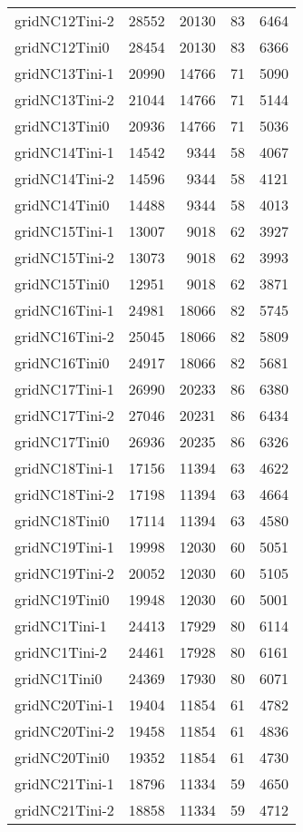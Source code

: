\begin{longtable}{lrrrr}
gridNC12Tini-2 & 28552 & 20130 & 83 & 6464 \\
gridNC12Tini0 & 28454 & 20130 & 83 & 6366 \\
gridNC13Tini-1 & 20990 & 14766 & 71 & 5090 \\
gridNC13Tini-2 & 21044 & 14766 & 71 & 5144 \\
gridNC13Tini0 & 20936 & 14766 & 71 & 5036 \\
gridNC14Tini-1 & 14542 & 9344 & 58 & 4067 \\
gridNC14Tini-2 & 14596 & 9344 & 58 & 4121 \\
gridNC14Tini0 & 14488 & 9344 & 58 & 4013 \\
gridNC15Tini-1 & 13007 & 9018 & 62 & 3927 \\
gridNC15Tini-2 & 13073 & 9018 & 62 & 3993 \\
gridNC15Tini0 & 12951 & 9018 & 62 & 3871 \\
gridNC16Tini-1 & 24981 & 18066 & 82 & 5745 \\
gridNC16Tini-2 & 25045 & 18066 & 82 & 5809 \\
gridNC16Tini0 & 24917 & 18066 & 82 & 5681 \\
gridNC17Tini-1 & 26990 & 20233 & 86 & 6380 \\
gridNC17Tini-2 & 27046 & 20231 & 86 & 6434 \\
gridNC17Tini0 & 26936 & 20235 & 86 & 6326 \\
gridNC18Tini-1 & 17156 & 11394 & 63 & 4622 \\
gridNC18Tini-2 & 17198 & 11394 & 63 & 4664 \\
gridNC18Tini0 & 17114 & 11394 & 63 & 4580 \\
gridNC19Tini-1 & 19998 & 12030 & 60 & 5051 \\
gridNC19Tini-2 & 20052 & 12030 & 60 & 5105 \\
gridNC19Tini0 & 19948 & 12030 & 60 & 5001 \\
gridNC1Tini-1 & 24413 & 17929 & 80 & 6114 \\
gridNC1Tini-2 & 24461 & 17928 & 80 & 6161 \\
gridNC1Tini0 & 24369 & 17930 & 80 & 6071 \\
gridNC20Tini-1 & 19404 & 11854 & 61 & 4782 \\
gridNC20Tini-2 & 19458 & 11854 & 61 & 4836 \\
gridNC20Tini0 & 19352 & 11854 & 61 & 4730 \\
gridNC21Tini-1 & 18796 & 11334 & 59 & 4650 \\
gridNC21Tini-2 & 18858 & 11334 & 59 & 4712 \\

\end{longtable}
